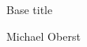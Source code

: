 \documentclass[11pt]{article}
\begin{document}


\begin{center}
{\LARGE{Base title}}

\vspace{3mm}
{\Large Michael Oberst}
\vspace{3mm}
\end{center}







\end{document}
